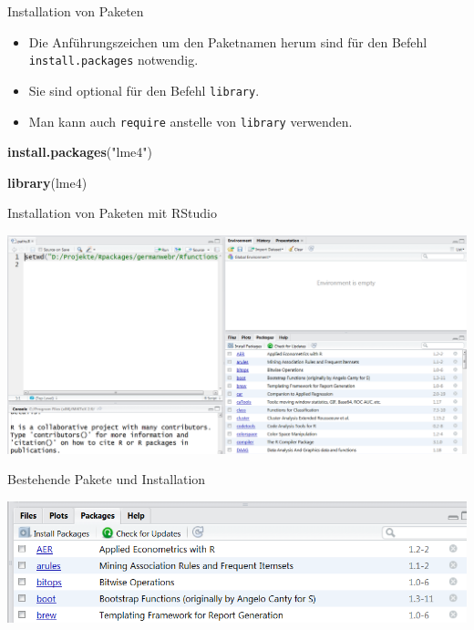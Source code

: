 \documentclass[ignorenonframetext,]{beamer}
\newenvironment{Shaded}{\begin{snugshade}}{\end{snugshade}}
\newcommand{\KeywordTok}[1]{\textcolor[rgb]{0.13,0.29,0.53}{\textbf{#1}}}
\newcommand{\StringTok}[1]{\textcolor[rgb]{0.31,0.60,0.02}{#1}}
\newcommand{\NormalTok}[1]{#1}
\providecommand{\tightlist}{%
  \setlength{\itemsep}{0pt}\setlength{\parskip}{0pt}}
\begin{document}
\begin{frame}[fragile]{Installation von Paketen}

\begin{itemize}
\tightlist
\item
  Die Anführungszeichen um den Paketnamen herum sind für den Befehl
  \texttt{install.packages} notwendig.
\item
  Sie sind optional für den Befehl \texttt{library}.
\item
  Man kann auch \texttt{require} anstelle von \texttt{library}
  verwenden.
\end{itemize}

\begin{Shaded}
\begin{Highlighting}[]
\KeywordTok{install.packages}\NormalTok{(}\StringTok{"lme4"}\NormalTok{)}

\KeywordTok{library}\NormalTok{(lme4)}
\end{Highlighting}
\end{Shaded}

\end{frame}

\begin{frame}{Installation von Paketen mit RStudio}

\includegraphics{figure/PaketeRstudio.PNG}

\end{frame}

\begin{frame}{Bestehende Pakete und Installation}

\includegraphics{figure/packages3.PNG}

\end{frame}
\end{document}
